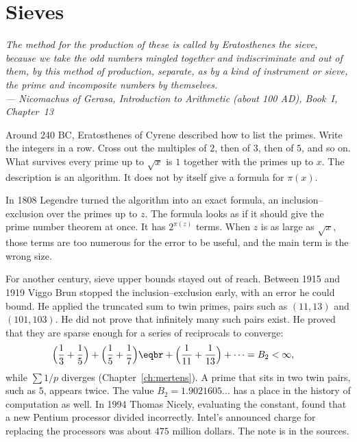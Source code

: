 \chapter{Sieves}\label{ch:sieves}

\begin{center}\itshape
The method for the production of these is called by Eratosthenes the sieve, because we take the odd numbers mingled together and indiscriminate
and out of them, by this method of production, separate, as by a kind of instrument or sieve, the prime and incomposite numbers by themselves.\\
\upshape --- Nicomachus of Gerasa, \emph{Introduction to Arithmetic} (about 100 AD), Book~I, Chapter~13
\end{center}

Around 240 BC, Eratosthenes of Cyrene described how to list the primes. Write the integers in a row. Cross out the multiples of $2$, then of $3$, then of $5$, and so on. What survives every prime up to $\sqrt x$ is $1$ together with the primes up to $x$. The description is an algorithm. It does not by itself give a formula for $\pi(x)$.

In 1808 Legendre turned the algorithm into an exact formula, an inclusion--exclusion over the primes up to $z$. The formula looks as if it should give the prime number theorem at once. It has $2^{\pi(z)}$ terms. When $z$ is as large as $\sqrt x$, those terms are too numerous for the error to be useful, and the main term is the wrong size.

For another century, sieve upper bounds stayed out of reach. Between 1915 and 1919 Viggo Brun stopped the inclusion--exclusion early, with an error he could bound. He applied the truncated sum to twin primes, pairs such as $(11,13)$ and $(101,103)$. He did not prove that infinitely many such pairs exist. He proved that they are sparse enough for a series of reciprocals to converge:
\[
\begin{aligned}\Bigl(\frac13+\frac15\Bigr)&+\Bigl(\frac15+\frac17\Bigr)\eqbr+\Bigl(\frac1{11}+\frac1{13}\Bigr)+\cdots=B_2<\infty,\end{aligned}
\]
while $\sum 1/p$ diverges (Chapter~\ref{ch:mertens}). A prime that sits in two twin pairs, such as $5$, appears twice. The value $B_2=1.9021605\ldots$ has a place in the history of computation as well. In 1994 Thomas Nicely, evaluating the constant, found that a new Pentium processor divided incorrectly. Intel's announced charge for replacing the processors was about $475$ million dollars. The note is in the sources.

